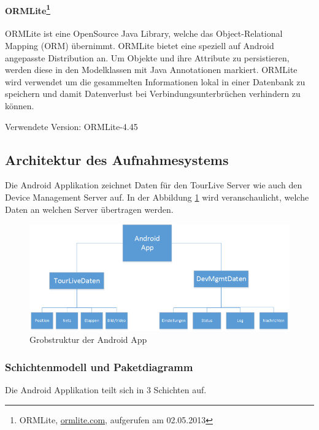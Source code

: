 \paragraph{ORMLite\footnote{ORMLite, \url{ormlite.com}, aufgerufen am 02.05.2013}} ORMLite ist eine OpenSource Java Library, welche das Object-Relational Mapping (ORM) übernimmt. ORMLite bietet eine speziell auf Android angepasste Distribution an. Um Objekte und ihre Attribute zu persistieren, werden diese in den Modelklassen mit Java Annotationen markiert. ORMLite wird verwendet um die gesammelten Informationen lokal in einer Datenbank zu speichern und damit Datenverlust bei Verbindungsunterbrüchen verhindern zu können.

Verwendete Version: ORMLite-4.45

\newpage

\subsection{Architektur des Aufnahmesystems}
Die Android Applikation zeichnet Daten für den TourLive Server wie auch den Device Management Server auf. In der Abbildung \ref{fig:grobstrukturandroid}
 wird veranschaulicht, welche Daten an welchen Server übertragen werden.

\begin{figure}[H]
	\centering
	\includegraphics[width=120mm]{images/android/uebersicht.png}
	\caption{Grobstruktur der Android App}
	\label{fig:grobstrukturandroid} 
\end{figure}

\subsubsection{Schichtenmodell und Paketdiagramm}
Die Android Applikation teilt sich in 3 Schichten auf.

